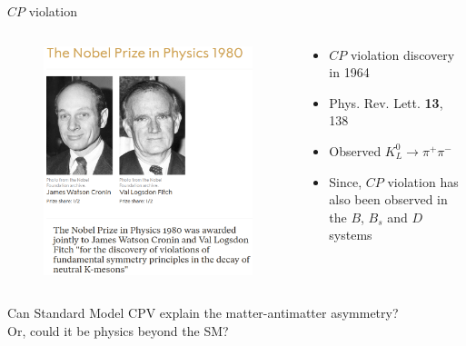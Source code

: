 \documentclass[dvipsnames]{beamer}
\begin{document}
\begin{frame}{$C\!P$ violation}
  \begin{columns}
    \begin{column}{0.4\textwidth}
      \begin{figure}
        \includegraphics[width=1.0\textwidth]{Plots/NobelPrize1980.png}
      \end{figure}
    \end{column}
    \begin{column}{0.6\textwidth}
      \begin{itemize}
        \setlength\itemsep{1.0em}
        \item{$C\!P$ violation discovery in 1964}
        \item{Phys. Rev. Lett. \textbf{13}, 138}
        \item{Observed $K_L^0\to\pi^+\pi^-$}
        \item{Since, $C\!P$ violation has also been observed in the $B$, $B_s$ and $D$ systems}
      \end{itemize}
    \end{column}
  \end{columns}
  \vspace{0.5cm}
  \begin{center}
    \large Can Standard Model CPV explain the matter-antimatter asymmetry?\\Or, could it be physics beyond the SM?
  \end{center}
\end{frame}
\end{document}
